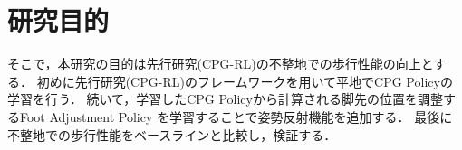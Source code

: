 \section{研究目的}
そこで，本研究の目的は先行研究(CPG-RL)の不整地での歩行性能の向上とする．
初めに先行研究(CPG-RL)のフレームワークを用いて平地でCPG Policyの学習を行う．
続いて，学習したCPG Policyから計算される脚先の位置を調整するFoot Adjustment Policy を学習することで姿勢反射機能を追加する．
最後に不整地での歩行性能をベースラインと比較し，検証する．
